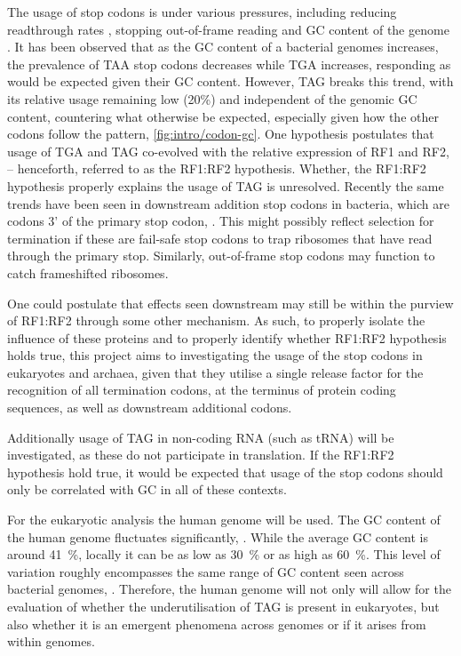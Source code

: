 \documentclass[../main.tex]{subfile}
\begin{document}
    The usage of stop codons is under various pressures, including reducing readthrough rates \autocite{Liang2005}, stopping out-of-frame reading \autocite{Tse2010} and GC content of the genome \autocite{Povolotskaya2012}.
    It has been observed that as the GC content of a bacterial genomes increases, the prevalence of TAA stop codons decreases while TGA increases, responding as would be expected given their GC content. However, TAG breaks this trend, with its relative usage remaining low (20\%) and independent of the genomic GC content, countering what otherwise be expected, especially given how the other codons follow the pattern, \cref{fig:intro/codon-gc}.
    One hypothesis postulates that usage of TGA and TAG co-evolved with the relative expression of RF1 and RF2, \autocite{Korkmaz2014} -- henceforth, referred to as the RF1:RF2 hypothesis. Whether, the RF1:RF2 hypothesis properly explains the usage of TAG is unresolved.
    Recently the same trends have been seen in downstream addition stop codons in bacteria, which are codons 3' of the primary stop codon, \autocite{Ho2019}. This might possibly reflect selection for termination if these are fail-safe stop codons to trap ribosomes that have read through the primary stop. Similarly, out-of-frame stop codons may function to catch frameshifted ribosomes.

    One could postulate that effects seen downstream may still be within the purview of RF1:RF2 through some other mechanism. As such, to properly isolate the influence of these proteins and to properly identify whether RF1:RF2 hypothesis holds true, this project aims to investigating the usage of the stop codons in eukaryotes and archaea, given that they utilise a single release factor for the recognition of all termination codons, at the terminus of protein coding sequences, as well as downstream additional codons.

    Additionally usage of TAG in non-coding RNA (such as tRNA) will be investigated, as these do not participate in translation. If the RF1:RF2 hypothesis hold true, it would be expected that usage of the stop codons should only be correlated with GC in all of these contexts.

    For the eukaryotic analysis the human genome will be used. The GC content of the human genome fluctuates significantly, \autocite{human2001}. While the average GC content is around \SI{41}{\percent}, locally it can be as low as \SI{30}{\percent} or as high as \SI{60}{\percent}. This level of variation roughly encompasses the same range of GC content seen across bacterial genomes, \autocite{Sueoka1962}. Therefore, the human genome will not only will allow for the evaluation of whether the underutilisation of TAG is present in eukaryotes, but also whether it is an emergent phenomena across genomes or if it arises from within genomes.
\end{document}
